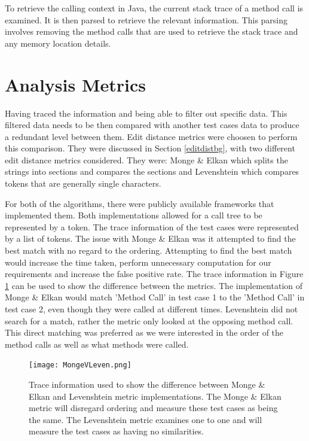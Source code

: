 To retrieve the calling context in Java, the current stack trace of a method call is examined. It is then parsed to retrieve the relevant information. This parsing involves removing the method calls that are used to retrieve the stack trace and any memory location details. 

\section{Analysis Metrics}
\label{S:metrics}
Having traced the information and being able to filter out specific data. This filtered data needs to be then compared with another test cases data to produce a redundant level between them. Edit distance metrics were choosen to perform this comparison. They were discussed in Section \ref{editdistbg}, with two different edit distance metrics considered. They were: Monge \& Elkan \cite{monge1997efficient} which splits the strings into sections and compares the sections and Levenshtein \cite{levenshtein1966binary} which compares tokens that are generally single characters. 

For both of the algorithms, there were publicly available frameworks that implemented them. Both implementations allowed for a call tree to be represented by a token. The trace information of the test cases were represented by a list of tokens. The issue with Monge \& Elkan was it attempted to find the best match with no regard to the ordering. Attempting to find the best match would increase the time taken, perform unnecessary computation for our requirements and increase the false positive rate. The trace information in Figure \ref{fig:mongevleven} can be used to show the difference between the metrics. The implementation of Monge \& Elkan would match 'Method Call' in test case 1 to the 'Method Call' in test case 2, even though they were called at different times. Levenshtein did not search for a match, rather the metric only looked at the opposing method call. This direct matching was preferred as we were interested in the order of the method calls as well as what methods were called.

\begin{figure}[h]
\begin{center}
\texttt{[image: MongeVLeven.png]}
\end{center}
\caption{Trace information used to show the difference between Monge \& Elkan and Levenshtein metric implementations. The Monge \& Elkan metric will disregard ordering and measure these test cases as being the same. The Levenshtein metric examines one to one and will measure the test cases as having no similarities.}
\label{fig:mongevleven}
\end{figure}

